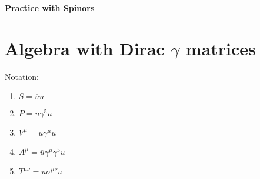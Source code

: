 \documentclass[12pt]{article}
\def \nn{\nonumber}
\def \nl{\nn \\}
\def \ou{\overline{u}}
\def \ga{\gamma}
\def \si{\sigma}
\begin{document}
\begin{center}
\underline{\textbf{\Large Practice with Spinors}}
\end{center}

\section{Algebra with Dirac $\ga$ matrices}

Notation:
\begin{enumerate} \itemsep=-15pt
\item $S= \ou u$\nl
\item $P=\ou \ga^5 u$ \nl
\item $V^\mu = \ou \ga^\mu u$ \nl
\item $A^\mu = \ou \ga^\mu \ga^5 u $ \nl
\item $T^{\mu\nu} = \ou \si^{\mu\nu} u$
\end{enumerate}
\bigskip
\end{document}
